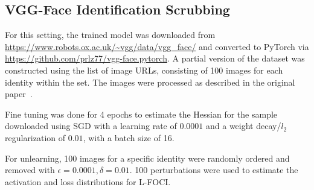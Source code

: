 \subsection{VGG-Face Identification Scrubbing}
For this setting, the trained model was downloaded from \url{https://www.robots.ox.ac.uk/~vgg/data/vgg_face/} and converted to PyTorch via \url{https://github.com/prlz77/vgg-face.pytorch}. A partial version of the dataset was constructed using the list of image URLs, consisting of 100 images for each identity within the set. The images were processed as described in the original paper~\citep{Parkhi15}.

Fine tuning was done for 4 epochs to estimate the Hessian for the sample downloaded using SGD with a learning rate of $0.0001$ and a weight decay/$l_2$ regularization of $0.01$, with a batch size of 16.

For unlearning, 100 images for a specific identity were randomly ordered and removed with $\epsilon=0.0001, \delta=0.01$. 100 perturbations were used to estimate the activation and loss distributions for L-FOCI.

